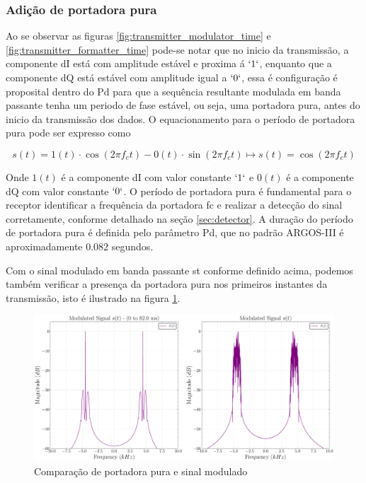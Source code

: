 \subsubsection{Adição de portadora pura}

Ao se observar as figuras \ref{fig:transmitter_modulator_time} e \ref{fig:transmitter_formatter_time} pode-se notar que no inicio da transmissão, a componente \gls{dI} está com amplitude estável e proxima á $`1`$, enquanto que a componente \gls{dQ} está estável com amplitude igual a $`0`$, essa é configuração é proposital dentro do \gls{Pd} para que a sequência resultante modulada em banda passante tenha um periodo de fase estável, ou seja, uma portadora pura, antes do inicio da transmissão dos dados. O equacionamento para o período de portadora pura pode ser expresso como

\begin{equation}
    s(t) = 1(t) \cdot \cos(2\pi f_c t) - 0(t) \cdot \sin(2\pi f_c t) \mapsto s(t) = \cos(2\pi f_c t)
\end{equation}

\noindent Onde $1(t)$ é a componente \gls{dI} com valor constante $`1`$ e $0(t)$ é a componente \gls{dQ} com valor constante $`0`$. O período de portadora pura é fundamental para o receptor identificar a frequência da portadora \gls{fc} e realizar a detecção do sinal corretamente, conforme detalhado na seção \ref{sec:detector}. A duração do período de portadora pura é definida pelo parâmetro \gls{Pd}, que no padrão \gls{ARGOS-III} é aproximadamente $0.082$ segundos.

Com o sinal modulado em banda passante \gls{st} conforme definido acima, podemos também verificar a presença da portadora pura nos primeiros instantes da transmissão, isto é ilustrado na figura \ref{fig:transmitter_modulator_portadora}.

\begin{figure}[H]
	\centering
	\caption{Comparação de portadora pura e sinal modulado}\label{fig:transmitter_modulator_portadora}
	\includegraphics[width=\linewidth]{assets/cap3/transmitter_modulator_portadora.pdf}
\end{figure}

